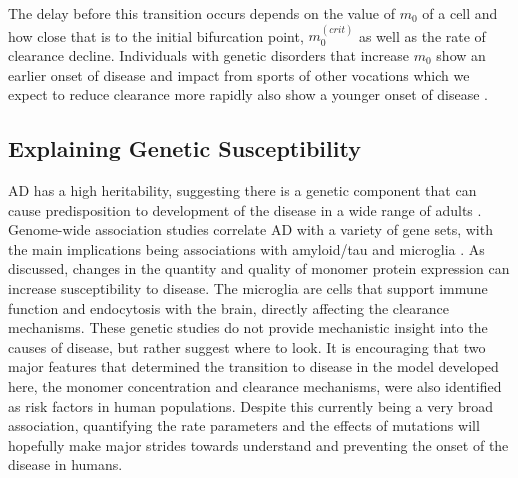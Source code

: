 The delay before this transition occurs depends on the value of $m_0$ of a cell and how close that is to the initial bifurcation point, $m_0^{(crit)}$ as well as the rate of clearance decline. Individuals with genetic disorders that increase $m_0$ show an earlier onset of disease  and impact from sports of other vocations which we expect to reduce clearance more rapidly also show a younger onset of disease .

\subsection{Explaining Genetic Susceptibility}

AD has a high heritability, suggesting there is a genetic component that can cause predisposition to development of the disease in a wide range of adults \cite{bellenguez_genetics_2020}. Genome-wide association studies correlate AD with a variety of gene sets, with the main implications being associations with amyloid/tau and microglia \cite{bellenguez_new_2022}. As discussed, changes in the quantity and quality of monomer protein expression can increase susceptibility to disease. The microglia are cells that support immune function and endocytosis with the brain, directly affecting the clearance mechanisms. These genetic studies do not provide mechanistic insight into the causes of disease, but rather suggest where to look. It is encouraging that two major features that determined the transition to disease in the model developed here, the monomer concentration and clearance mechanisms, were also identified as risk factors in human populations. Despite this currently being a very broad association, quantifying the rate parameters and the effects of mutations will hopefully make major strides towards understand and preventing the onset of the disease in humans.

